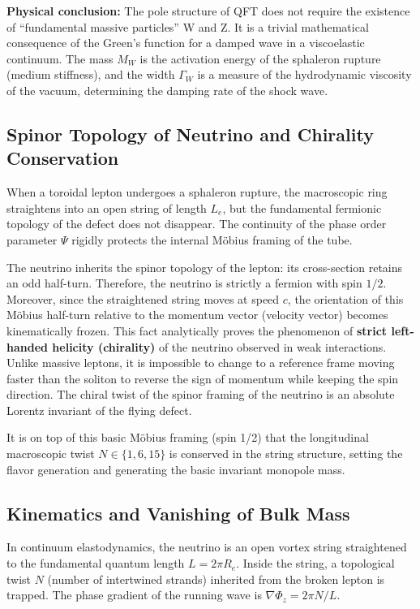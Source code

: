 \documentclass[11pt,a4paper]{article}
\begin{document}
\textbf{Physical conclusion:} The pole structure of QFT does not require the existence of ``fundamental massive particles'' W and Z. It is a trivial mathematical consequence of the Green's function for a damped wave in a viscoelastic continuum. The mass $M_W$ is the activation energy of the sphaleron rupture (medium stiffness), and the width $\Gamma_W$ is a measure of the hydrodynamic viscosity of the vacuum, determining the damping rate of the shock wave.

\subsection{Spinor Topology of Neutrino and Chirality Conservation}
When a toroidal lepton undergoes a sphaleron rupture, the macroscopic ring straightens into an open string of length $L_e$, but the fundamental fermionic topology of the defect does not disappear. The continuity of the phase order parameter $\Psi$ rigidly protects the internal Möbius framing of the tube.

The neutrino inherits the spinor topology of the lepton: its cross-section retains an odd half-turn. Therefore, the neutrino is strictly a fermion with spin $1/2$. Moreover, since the straightened string moves at speed $c$, the orientation of this Möbius half-turn relative to the momentum vector (velocity vector) becomes kinematically frozen.
This fact analytically proves the phenomenon of \textbf{strict left-handed helicity (chirality)} of the neutrino observed in weak interactions. Unlike massive leptons, it is impossible to change to a reference frame moving faster than the soliton to reverse the sign of momentum while keeping the spin direction. The chiral twist of the spinor framing of the neutrino is an absolute Lorentz invariant of the flying defect.

It is on top of this basic Möbius framing (spin 1/2) that the longitudinal macroscopic twist $N \in \{1, 6, 15\}$ is conserved in the string structure, setting the flavor generation and generating the basic invariant monopole mass.

\subsection{Kinematics and Vanishing of Bulk Mass}
In continuum elastodynamics, the neutrino is an open vortex string straightened to the fundamental quantum length $L = 2\pi R_e$. Inside the string, a topological twist $N$ (number of intertwined strands) inherited from the broken lepton is trapped. The phase gradient of the running wave is $\nabla \Phi_z = 2\pi N / L$.
\end{document}

